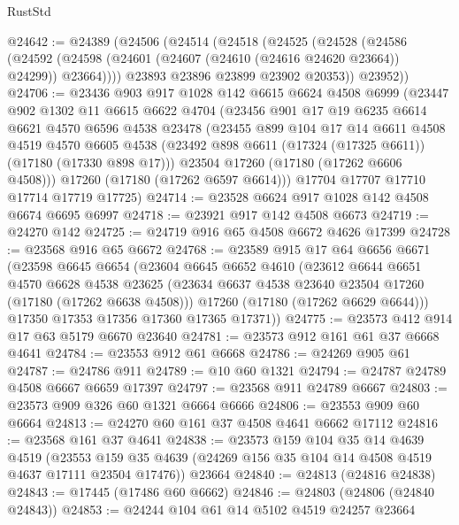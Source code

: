 \begin{lexlean}{RustStd}
\begin{coremodule}
@24642 := @24389
    (@24506
      (@24514
        (@24518
          (@24525
            (@24528
              (@24586
                (@24592 (@24598 (@24601 (@24607 (@24610 (@24616 @24620 @23664)) @24299)) @23664))))
            @23893
            @23896
            @23899
            @23902
            @20353))
        @23952))
@24706 := @23436
    @903
    @917
    @1028
    @142
    @6615
    @6624
    @4508
    @6999
    (@23447
      @902
      @1302
      @11
      @6615
      @6622
      @4704
      (@23456
        @901
        @17
        @19
        @6235
        @6614
        @6621
        @4570
        @6596
        @4538
        @23478
        (@23455
          @899
          @104
          @17
          @14
          @6611
          @4508
          @4519
          @4570
          @6605
          @4538
          (@23492 @898 @6611 (@17324 (@17325 @6611)) (@17180 (@17330 @898 @17)))
          @23504
          @17260
          (@17180 (@17262 @6606 @4508)))
        @17260
        (@17180 (@17262 @6597 @6614)))
      @17704
      @17707
      @17710
      @17714
      @17719
      @17725)
@24714 := @23528 @6624 @917 @1028 @142 @4508 @6674 @6695 @6997
@24718 := @23921 @917 @142 @4508 @6673
@24719 := @24270 @142
@24725 := @24719 @916 @65 @4508 @6672 @4626 @17399
@24728 := @23568 @916 @65 @6672
@24768 := @23589
    @915
    @17
    @64
    @6656
    @6671
    (@23598
      @6645
      @6654
      (@23604
        @6645
        @6652
        @4610
        (@23612
          @6644
          @6651
          @4570
          @6628
          @4538
          @23625
          (@23634 @6637 @4538 @23640 @23504 @17260 (@17180 (@17262 @6638 @4508)))
          @17260
          (@17180 (@17262 @6629 @6644)))
        @17350
        @17353
        @17356
        @17360
        @17365
        @17371))
@24775 := @23573 @412 @914 @17 @63 @5179 @6670 @23640
@24781 := @23573 @912 @161 @61 @37 @6668 @4641
@24784 := @23553 @912 @61 @6668
@24786 := @24269 @905 @61
@24787 := @24786 @911
@24789 := @10 @60 @1321
@24794 := @24787 @24789 @4508 @6667 @6659 @17397
@24797 := @23568 @911 @24789 @6667
@24803 := @23573 @909 @326 @60 @1321 @6664 @6666
@24806 := @23553 @909 @60 @6664
@24813 := @24270 @60 @161 @37 @4508 @4641 @6662 @17112
@24816 := @23568 @161 @37 @4641
@24838 := @23573
    @159
    @104
    @35
    @14
    @4639
    @4519
    (@23553 @159 @35 @4639 (@24269 @156 @35 @104 @14 @4508 @4519 @4637 @17111 @23504 @17476))
    @23664
@24840 := @24813 (@24816 @24838)
@24843 := @17445 (@17486 @60 @6662)
@24846 := @24803 (@24806 (@24840 @24843))
@24853 := @24244 @104 @61 @14 @5102 @4519 @24257 @23664

\end{coremodule}
\end{lexlean}
